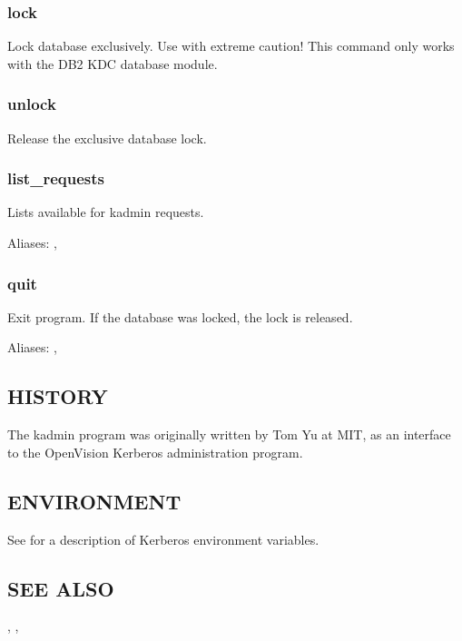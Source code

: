 \documentclass[letterpaper,10pt,english]{sphinxmanual}
\begin{document}
\subsubsection{lock}
\label{\detokenize{admin/admin_commands/kadmin_local:ktremove-end}}\label{\detokenize{admin/admin_commands/kadmin_local:lock}}
Lock database exclusively.  Use with extreme caution!  This command
only works with the DB2 KDC database module.


\subsubsection{unlock}
\label{\detokenize{admin/admin_commands/kadmin_local:unlock}}
Release the exclusive database lock.


\subsubsection{list\_requests}
\label{\detokenize{admin/admin_commands/kadmin_local:list-requests}}
Lists available for kadmin requests.

Aliases: , 


\subsubsection{quit}
\label{\detokenize{admin/admin_commands/kadmin_local:quit}}
Exit program.  If the database was locked, the lock is released.

Aliases: , 


\subsection{HISTORY}
\label{\detokenize{admin/admin_commands/kadmin_local:history}}
The kadmin program was originally written by Tom Yu at MIT, as an
interface to the OpenVision Kerberos administration program.


\subsection{ENVIRONMENT}
\label{\detokenize{admin/admin_commands/kadmin_local:environment}}
See  for a description of Kerberos environment
variables.


\subsection{SEE ALSO}
\label{\detokenize{admin/admin_commands/kadmin_local:see-also}}
, {\hyperref[\detokenize{admin/admin_commands/kadmind:kadmind-8}]{}}, 
\end{document}
